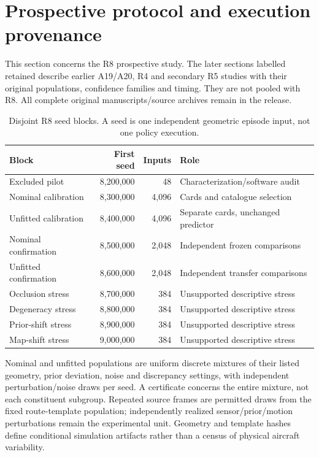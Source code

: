 \section{Prospective protocol and execution provenance}\label{supp:r8-protocol}
This section concerns the R8 prospective study. The later sections labelled retained describe earlier A19/A20, R4 and secondary R5 studies with their original populations, confidence families and timing. They are not pooled with R8. All complete original manuscripts/source archives remain in the release.

\begin{table}[!htbp]\centering\small
\caption{Disjoint R8 seed blocks. A seed is one independent geometric episode input, not one policy execution.}\label{supp:r8-seeds}
\begin{tabular}{@{}lrrl@{}}\toprule
Block & First seed & Inputs & Role\\\midrule
Excluded pilot &8,200,000&48&Characterization/software audit\\
Nominal calibration &8,300,000&4,096&Cards and catalogue selection\\
Unfitted calibration &8,400,000&4,096&Separate cards, unchanged predictor\\
Nominal confirmation &8,500,000&2,048&Independent frozen comparisons\\
Unfitted confirmation &8,600,000&2,048&Independent transfer comparisons\\
Occlusion stress &8,700,000&384&Unsupported descriptive stress\\
Degeneracy stress &8,800,000&384&Unsupported descriptive stress\\
Prior-shift stress &8,900,000&384&Unsupported descriptive stress\\
Map-shift stress &9,000,000&384&Unsupported descriptive stress\\\bottomrule
\end{tabular}
\end{table}

Nominal and unfitted populations are uniform discrete mixtures of their listed geometry, prior deviation, noise and discrepancy settings, with independent perturbation/noise draws per seed. A certificate concerns the entire mixture, not each constituent subgroup. Repeated source frames are permitted draws from the fixed route-template population; independently realized sensor/prior/motion perturbations remain the experimental unit. Geometry and template hashes define conditional simulation artifacts rather than a census of physical aircraft variability.


